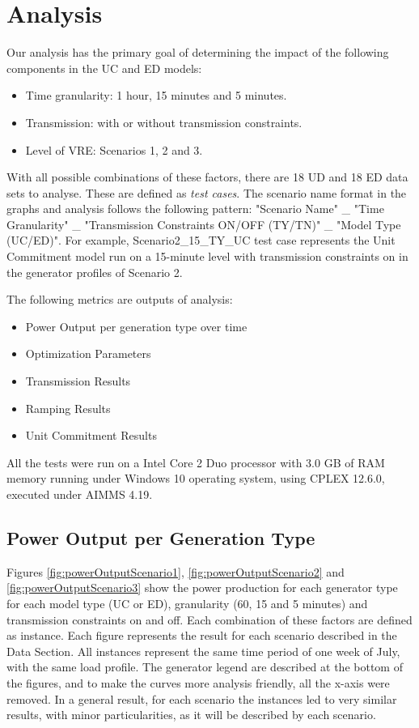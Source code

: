 \documentclass[12pt,LUDisStyle,twosided]{book}
\begin{document}
\chapter{Analysis}

Our analysis has the primary goal of determining the impact of the following components in the UC and ED models:

\begin{itemize}
\item Time granularity: 1 hour, 15 minutes and 5 minutes.
\item Transmission: with or without transmission constraints.
\item Level of VRE: Scenarios 1, 2 and 3.
\end{itemize}

With all possible combinations of these factors, there are 18 UD and 18 ED data sets to analyse. These are defined as \textit{test cases}. The scenario name format in the graphs and analysis follows the following pattern:
"Scenario Name" \_ "Time Granularity" \_ "Transmission Constraints ON/OFF (TY/TN)" \_ "Model Type (UC/ED)". For example, Scenario2\_15\_TY\_UC test case represents the Unit Commitment model run on a 15-minute level with transmission constraints on in the generator profiles of Scenario 2.

The following metrics are outputs of analysis:

\begin{itemize}
\item Power Output per generation type over time
\item Optimization Parameters
\item Transmission Results
\item Ramping Results
\item Unit Commitment Results
\end{itemize}

All the tests were run on a Intel Core 2 Duo processor with 3.0 GB of RAM memory running under Windows 10 operating system, using CPLEX 12.6.0, executed under AIMMS 4.19.


\section{Power Output per Generation Type}

Figures \ref{fig:powerOutputScenario1}, \ref{fig:powerOutputScenario2} and \ref{fig:powerOutputScenario3} show the power production for each generator type for each model type (UC or ED), granularity (60, 15 and 5 minutes) and transmission constraints on and off. Each combination of these factors are defined as instance. Each figure represents the result for each scenario described in the Data Section. All instances represent the same time period of one week of July, with the same load profile. The generator legend are described at the bottom of the figures, and to make the curves more analysis friendly, all the x-axis were removed. In a general result, for each scenario the instances led to very similar results, with minor particularities, as it will be described by each scenario.
\end{document}
